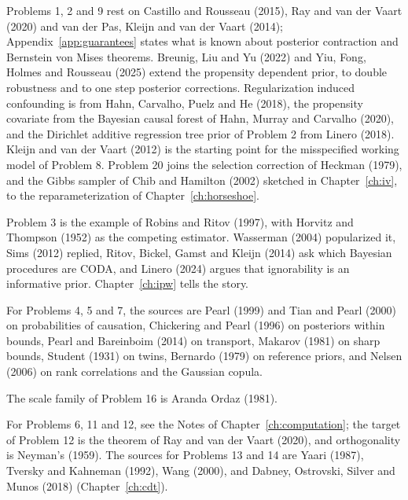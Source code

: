 Problems 1, 2 and 9 rest on Castillo and Rousseau (2015), Ray and van der Vaart (2020) and van der Pas, Kleijn and van der Vaart (2014); Appendix~\ref{app:guarantees} states what is known about posterior contraction and Bernstein von Mises theorems. Breunig, Liu and Yu (2022) and Yiu, Fong, Holmes and Rousseau (2025) extend the propensity dependent prior, to double robustness and to one step posterior corrections. Regularization induced confounding is from Hahn, Carvalho, Puelz and He (2018), the propensity covariate from the Bayesian causal forest of Hahn, Murray and Carvalho (2020), and the Dirichlet additive regression tree prior of Problem 2 from Linero (2018). Kleijn and van der Vaart (2012) is the starting point for the misspecified working model of Problem 8. Problem 20 joins the selection correction of Heckman (1979), and the Gibbs sampler of Chib and Hamilton (2002) sketched in Chapter~\ref{ch:iv}, to the reparameterization of Chapter~\ref{ch:horseshoe}.

Problem 3 is the example of Robins and Ritov (1997), with Horvitz and Thompson (1952) as the competing estimator. Wasserman (2004) popularized it, Sims (2012) replied, Ritov, Bickel, Gamst and Kleijn (2014) ask which Bayesian procedures are CODA, and Linero (2024) argues that ignorability is an informative prior. Chapter~\ref{ch:ipw} tells the story.

For Problems 4, 5 and 7, the sources are Pearl (1999) and Tian and Pearl (2000) on probabilities of causation, Chickering and Pearl (1996) on posteriors within bounds, Pearl and Bareinboim (2014) on transport, Makarov (1981) on sharp bounds, Student (1931) on twins, Bernardo (1979) on reference priors, and Nelsen (2006) on rank correlations and the Gaussian copula.

The scale family of Problem 16 is Aranda Ordaz (1981).

For Problems 6, 11 and 12, see the Notes of Chapter~\ref{ch:computation}; the target of Problem 12 is the theorem of Ray and van der Vaart (2020), and orthogonality is Neyman's (1959). The sources for Problems 13 and 14 are Yaari (1987), Tversky and Kahneman (1992), Wang (2000), and Dabney, Ostrovski, Silver and Munos (2018) (Chapter~\ref{ch:cdt}).
